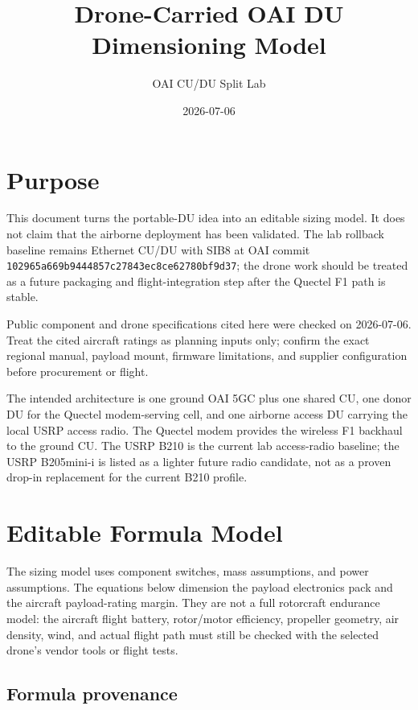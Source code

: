 \documentclass[11pt]{article}
\title{Drone-Carried OAI DU Dimensioning Model}
\author{OAI CU/DU Split Lab}
\date{2026-07-06}
\begin{document}
\maketitle

\section*{Purpose}

This document turns the portable-DU idea into an editable sizing model. It does
not claim that the airborne deployment has been validated. The lab rollback
baseline remains Ethernet CU/DU with SIB8 at OAI commit
\texttt{102965a669b9444857c27843ec8ce62780bf9d37}; the drone work should be
treated as a future packaging and flight-integration step after the Quectel F1
path is stable.

Public component and drone specifications cited here were checked on
2026-07-06. Treat the cited aircraft ratings as planning inputs only; confirm
the exact regional manual, payload mount, firmware limitations, and supplier
configuration before procurement or flight.

The intended architecture is one ground OAI 5GC plus one shared CU, one donor DU
for the Quectel modem-serving cell, and one airborne access DU carrying the
local USRP access radio. The Quectel modem provides the wireless F1 backhaul to
the ground CU. The USRP B210 is the current lab access-radio baseline; the USRP
B205mini-i is listed as a lighter future radio candidate, not as a proven
drop-in replacement for the current B210 profile.

\section*{Editable Formula Model}

The sizing model uses component switches, mass assumptions, and power
assumptions. The equations below dimension the payload electronics pack and the
aircraft payload-rating margin. They are not a full rotorcraft endurance model:
the aircraft flight battery, rotor/motor efficiency, propeller geometry, air
density, wind, and actual flight path must still be checked with the selected
drone's vendor tools or flight tests.

\subsection*{Formula provenance}
\end{document}

